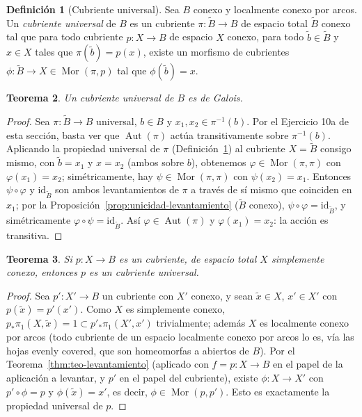 \documentclass[11pt,a4paper]{article}
\theoremstyle{plain}
\newtheorem{theorem}{Teorema}[section]
\theoremstyle{definition}
\newtheorem{definition}[theorem]{Definición}
\theoremstyle{remark}
\DeclareMathOperator{\Aut}{Aut}
\DeclareMathOperator{\Mor}{Mor}
\begin{document}
\begin{definition}[Cubriente universal]
\label{def:cubriente-universal}
Sea $B$ conexo y localmente conexo por arcos. Un \emph{cubriente universal}
de $B$ es un cubriente $\pi:\tilde B\to B$ de espacio total $\tilde B$
conexo tal que para todo cubriente $p:X\to B$ de espacio $X$ conexo, para
todo $\tilde b\in\tilde B$ y $x\in X$ tales que $\pi(\tilde b)=p(x)$, existe
un morfismo de cubrientes $\phi:\tilde B\to X\in\Mor(\pi,p)$ tal que
$\phi(\tilde b)=x$.
\end{definition}

\begin{theorem}
\label{thm:cubriente-universal-galois}
Un cubriente universal de $B$ es de Galois.
\end{theorem}

\begin{proof}
Sea $\pi:\tilde B\to B$ universal, $b\in B$ y $x_1,x_2\in\pi^{-1}(b)$. Por
el Ejercicio 10a de esta sección, basta ver que $\Aut(\pi)$ actúa
transitivamente sobre $\pi^{-1}(b)$. Aplicando la propiedad universal de
$\pi$ (Definición~\ref{def:cubriente-universal}) al cubriente $X=\tilde B$
consigo mismo, con $\tilde b=x_1$ y $x=x_2$ (ambos sobre $b$), obtenemos
$\varphi\in\Mor(\pi,\pi)$ con $\varphi(x_1)=x_2$; simétricamente, hay
$\psi\in\Mor(\pi,\pi)$ con $\psi(x_2)=x_1$. Entonces $\psi\circ\varphi$ y
$\mathrm{id}_{\tilde B}$ son ambos levantamientos de $\pi$ a través de sí
mismo que coinciden en $x_1$; por la
Proposición~\ref{prop:unicidad-levantamiento} ($\tilde B$ conexo),
$\psi\circ\varphi=\mathrm{id}_{\tilde B}$, y simétricamente
$\varphi\circ\psi=\mathrm{id}_{\tilde B}$. Así $\varphi\in\Aut(\pi)$ y
$\varphi(x_1)=x_2$: la acción es transitiva.
\end{proof}

\begin{theorem}
\label{thm:simplemente-conexo-es-universal}
Si $p:X\to B$ es un cubriente, de espacio total $X$ simplemente conexo,
entonces $p$ es un cubriente universal.
\end{theorem}

\begin{proof}
Sea $p':X'\to B$ un cubriente con $X'$ conexo, y sean $\tilde x\in X$,
$x'\in X'$ con $p(\tilde x)=p'(x')$. Como $X$ es simplemente conexo,
$p_*\pi_1(X,\tilde x)=1\subset p'_*\pi_1(X',x')$ trivialmente; además $X$
es localmente conexo por arcos (todo cubriente de un espacio localmente
conexo por arcos lo es, vía las hojas evenly covered, que son
homeomorfas a abiertos de $B$). Por el
Teorema~\ref{thm:teo-levantamiento} (aplicado con $f=p:X\to B$ en el
papel de la aplicación a levantar, y $p'$ en el papel del cubriente),
existe $\phi:X\to X'$ con $p'\circ\phi=p$ y $\phi(\tilde x)=x'$, es decir,
$\phi\in\Mor(p,p')$. Esto es exactamente la propiedad universal de
$p$.
\end{proof}
\end{document}
